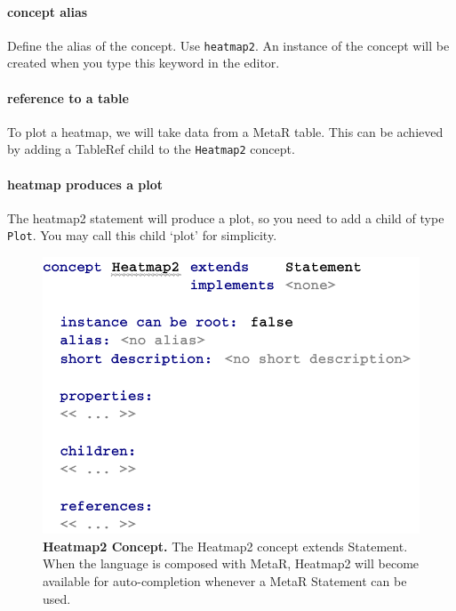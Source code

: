 \paragraph{concept alias}
Define the alias of the concept. Use \texttt{heatmap2}. An instance of the concept will be created when you type this keyword in the editor. 

\paragraph{reference to a table}
To plot a heatmap, we will take data from a MetaR table. This can be achieved by adding a TableRef child to the \texttt{Heatmap2} concept.
\paragraph{heatmap produces a plot}
The heatmap2 statement will produce a plot, so you need to add a child of type \texttt{Plot}. You may call this child `plot' for simplicity.

\begin{figure}[htbp]
  \centering
  \includegraphics[width=\figWidthNarrow]{figures/Heatmap2Concept.pdf}
\caption[Heatmap2 Concept.]{\textbf{Heatmap2 Concept.} The Heatmap2 concept extends Statement. When the language is composed with MetaR, Heatmap2 will become available for auto-completion whenever a MetaR Statement can be used.}
\label{fig:Heatmap2Concept}
\end{figure}

